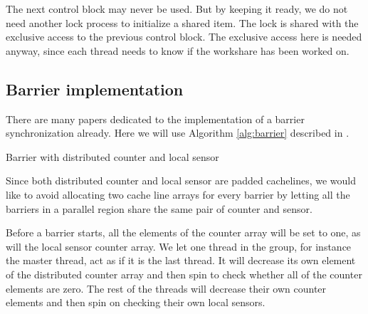 The next control block may never be used. But by keeping it ready, we
do not need another lock process to initialize a shared item. The lock
is shared with the exclusive access to the previous control block.
The exclusive access here is needed anyway, since each thread needs
to know if the workshare has been worked on.

\subsection{Barrier implementation}
\label{sec:barrier}

There are many papers dedicated to the implementation of a barrier synchronization
already. Here we will use
Algorithm \ref{alg:barrier} described in \cite{Zha03}.



\begin{algorithm}[h]
  \SetLine
{\small
  \BlankLine
}
  \caption{Barrier with distributed counter and local sensor}
  \label{alg:barrier}
\end{algorithm}


Since both distributed counter and local sensor are padded cachelines,
we would like to avoid allocating two cache line arrays for every
barrier by letting all the barriers in a parallel region share the
same pair of counter and sensor.

Before a barrier starts, all the elements of the counter array will be
set to one, as will the local sensor counter array. We let one thread
in the group, for instance the master thread, act as if it is the last
thread. It will decrease its own element of the distributed counter
array and then spin to check whether all of the counter elements are
zero. The rest of the threads will decrease their own counter elements
and then spin on checking their own local sensors.


